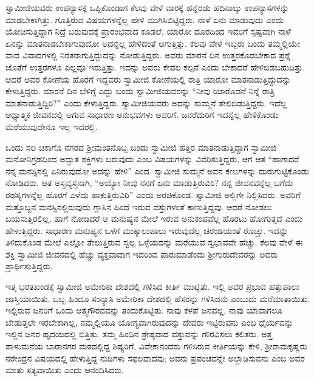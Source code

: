  ಸ್ವಾಮೀಜಿಯವರು ಉಪನ್ಯಾಸಕ್ಕೆ ಒಪ್ಪಿಕೊಂಡಾಗ ಕೆಲವು ವೇಳೆ ವಾರಕ್ಕೆ ಹನ್ನೆರಡು ಹದಿನಾಲ್ಕು ಉಪನ್ಯಾಸಗಳನ್ನು ಮಾಡಬೇಕಾಗಿತ್ತು. ಗೊತ್ತಿರುವ ವಿಷಯಗಳನ್ನೆಲ್ಲ ಹೇಳಿ ಮುಗಿಸಿಬಿಟ್ಟಿದ್ದರು. ನಾಳೆ ಏನು ಮಾಡುವುದು ಎಂದು ಯೋಚಿಸುತ್ತಿದ್ದಾಗ ನಿದ್ರೆ ಬರುವುದಕ್ಕೆ ಪ್ರಾರಂಭವಾದ ಕೂಡಲೆ, ಯಾರೋ‌ ದೂರದಿಂದ ಇವರಿಗೆ ಸ್ಪಷ್ಟವಾಗಿ ನಾಳೆ ಏನನ್ನು ಮಾತನಾಡಬೇಕಾಗುವುದೋ ಅದನ್ನೆಲ್ಲ ಹೇಳಿದಂತೆ ಆಗುತ್ತಿತ್ತು. ಕೆಲವು ವೇಳೆ ಇಬ್ಬರು ಬಂದು ತಮ್ಮಲ್ಲಿಯೇ ವಾದ ವಿವಾದಗಳಲ್ಲಿ ನಿರತರಾಗುತ್ತಿದ್ದುದನ್ನು ನೋಡುತ್ತಿದ್ದರು. ಅವರು ಮಾರನೆ ದಿನ ಉತ್ತರಕೊಡಬೇಕಾದ ಪ್ರಶ್ನೆ ಜೊತೆಗೆ ಉತ್ತರಗಳೂ ಎಲ್ಲವೂ ಇರುತ್ತಿತ್ತು. ಇದನ್ನು ಅವರು ಕೇವಲ ಕಲ್ಪನೆ ಎಂದು ಬೇಕಾದರೆ ಹೇಳಿಬಿಡಬಹುದಿತ್ತು. ಆದರೆ ಅವರ ಕೋಣೆಯ ಹೊರಗೆ ಇದ್ದವರು ಸ್ವಾಮೀಜಿ ಕೋಣೆಯಲ್ಲಿ ರಾತ್ರಿ ಯಾರೋ ಮಾತನಾಡುತ್ತಿದ್ದುದನ್ನು ಕೇಳುತ್ತಿದ್ದರು. ಮಾರನೆ ದಿನ ಬೆಳಿಗ್ಗೆ ಎದ್ದು ಬಂದು ಸ್ವಾಮೀಜಿಯವರನ್ನು “ನೀವು ಯಾರೊಡನೆ ನಿನ್ನೆ ರಾತ್ರಿ ಮಾತನಾಡುತ್ತಿದ್ದಿರಿ?” ಎಂದು ಕೇಳುತ್ತಿದ್ದರು. ಸ್ವಾಮೀಜಿಯವರು ಅದನ್ನು ಸುಮ್ಮನೆ ತೇಲಿಬಿಡುತ್ತಿದ್ದರು. ಇದೆಲ್ಲ ಆಧ್ಯಾತ್ಮಿಕ ಜೀವನದಲ್ಲಿ ಆಗುವ ಸಾಧಾರಣ ಅನುಭವಗಳು ಅವರಿಗೆ. ಜನರೆದುರಿಗೆ ಇದನ್ನೆಲ್ಲ ಹೇಳಿಕೊಂಡು ಮೆರೆಯುವುದೇನೂ ಇಲ್ಲ ಇದರಲ್ಲಿ. 

 ಒಂದು ಸಲ ಚಿಕಾಗೊ ನಗರದ ಶ‍್ರೀಮಂತನೊಬ್ಬ ಬಂದು ಸ್ವಾಮೀಜಿ ಹತ್ತಿರ ಮಾತನಾಡುತ್ತಿದ್ದಾಗ ಸ್ವಾಮೀಜಿ ಮನೋನಿಗ್ರಹದಿಂದ ಅದ್ಭುತ ಶಕ್ತಿಗಳು ಬರುವುದು ಎಂಬ ವಿಷಯಗಳನ್ನು ವಿವರಿಸುತ್ತಿದ್ದರು. ಆಗ ಆತ “ಹಾಗಾದರೆ ನನ್ನ ಮನಸ್ಸಿನಲ್ಲಿ ಏನಿರುವುದೋ ಅದನ್ನು ಹೇಳಿ” ಎಂದ. ಸ್ವಾಮೀಜಿ ಸುಮ್ಮನೆ ಅವನ ಕಣುಗಳನ್ನು ದುರುಗುಟ್ಟಿಕೊಂಡು ನೋಡಿದರು. ಆತ ಅಸ್ತವ್ಯಸ್ತನಾಗಿ, “ಅಯ್ಯೋ ನೀವು ನನಗೆ ಏನು ಮಾಡುತ್ತಿರುವಿರಿ? ನನ್ನ ಜೀವನವನ್ನೆಲ್ಲ ಬಗೆದು ರಹಸ್ಯಗಳನ್ನೆಲ್ಲ ಹೊರಗೆ ಎಳೆದು ಹಾಕುತ್ತಿರುವಿರಿ” ಎಂದು ಅರಚಿಕೊಂಡ. ಸ್ವಾಮೀಜಿ ಅಲ್ಲಿಗೇ ನಿಲ್ಲಿಸಿದರು. ಅವರಿಗೆ ಮತ್ತೊಬ್ಬನ ಮನಸ್ಸಿನಲ್ಲಿರುವುದು ಗ್ಲಾಸಿನ ಹಿಂದೆ ಇರುವ ವಸ್ತುಗಳಂತೆ ಕಾಣುತ್ತಿದ್ದವು. ಆದರೆ ನೋಡಲು ಬಯಸುತ್ತಿರಲಿಲ್ಲ. ಹಾಗೆ ನೋಡಿದರೆ ಆ ಮನುಷ್ಯನ ಮೇಲೆ ಇರುವ ಅನುಕಂಪವೆಲ್ಲ ಹೊರಟು ಹೋಗುತ್ತದೆ ಎಂದು ಹೇಳುತ್ತಿದ್ದರು. ಸಾಧಾರಣ ಮನುಷ್ಯನ ಒಳಗೆ ಮುಕ್ಕಾಲುಪಾಲು ಇರುವುದೆಲ್ಲ ಚರಂಡಿಯಂತೆ ರೊಚ್ಚು. ಇದನ್ನು ತಿಳಿದುಕೊಂಡ ಮೇಲೆ ಎಲ್ಲೋ ತೇಲುತ್ತಿರುವ ಸ್ವಲ್ಪ ಒಳ್ಳೆಯದನ್ನು ಮರೆಯುವ ಸ್ವಭಾವವೇ ಹೆಚ್ಚು. ಕೆಲವು ವೇಳೆ ಈ ಶಕ್ತಿ ಸ್ವಾಮೀಜಿ ಜೀವನದಲ್ಲಿ ಹೆಚ್ಚು ವ್ಯಕ್ತವಾದಾಗ ಇದರಿಂದ ಪಾರುಮಾಡೆಂದು ಶ‍್ರೀಗುರುದೇವರನ್ನು ಅವರು ಪ್ರಾರ್ಥಿಸುತ್ತಿದ್ದರು. 

 ಇತ್ತ ಭರತಖಂಡಕ್ಕೆ ಸ್ವಾಮೀಜಿ ಅಮೇರಿಕಾ ದೇಶದಲ್ಲಿ ಗಳಿಸಿದ ಕೀರ್ತಿ ಮುಟ್ಟಿತು. ಇಲ್ಲಿ ಅವರ ಪ್ರಭಾವ ಹತ್ತುಪಾಲು ಜಾಸ್ತಿಯಾಯಿತು. ಒಬ್ಬ ಹಿಂದೂ ಸಂನ್ಯಾಸಿ ಅಮೇರಿಕಾ ದೇಶದಲ್ಲಿ ಹೆಸರನ್ನು ಗಳಿಸಿದನು ಎಂಬುದು ಮನೆಮಾತಾಯಿತು. ಇಲ್ಲಿರುವ ಜನರಿಗೆ ಒಂದು ಆತ್ಮಗೌರವವನ್ನು ತಂದುಕೊಟ್ಟಿತು. ನಾವು ಕಳಪೆ ಜನವಲ್ಲ, ನಾವು ಯಾವಾಗಲೂ ಬೇಡುತ್ತಲೇ ಇರಬೇಕಾಗಿಲ್ಲ, ನಮ್ಮಲ್ಲಿಯೂ ಯೋಗ್ಯವಾಗಿರುವುದನ್ನು ದೇವರು ಇಟ್ಟಿರುವನು ಎಂಬ ಧೈರ್ಯವನ್ನು ಇಲ್ಲಿನ ಜನರ ಹೃದಯದಲ್ಲಿ ಬಿತ್ತಿತು. ತಮ್ಮ ಹಿಂದಿನ ಶ್ರೇಷ್ಠವಾದ ವಸ್ತುವನ್ನು ಗೌರವಿಸಲು ಕಲಿತರು. ಅತ್ತ ಪಾಳುಮನೆಯ ಬಾರಾನಗರ ಮಠದಲ್ಲಿದ್ದ ಶಿಷ್ಯರಿಗೆ, ವಿವೇಕಾನಂದರು ಗಳಿಸಿರುವ ಕೀರ್ತಿಯನ್ನು ಕೇಳಿ, ಶ‍್ರೀರಾಮಕೃಷ್ಣರು ನರೇಂದ್ರನ ವಿಷಯದಲ್ಲಿ ಹೇಳುತ್ತಿದ್ದ ನುಡಿಗಳು ಸಫಲವಾದವು; ಅವನು ಪ್ರಪಂಚವನ್ನೇ ಅಲ್ಲಾಡಿಸುವನು ಎಂಬ ಅವರ ಮಾತು ಸತ್ಯವಾಯಿತು ಎಂದು ಆನಂದಿಸಿದರು. 

